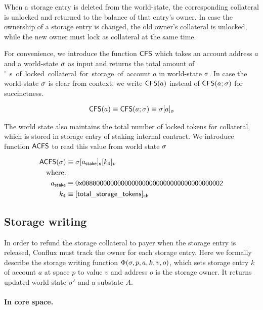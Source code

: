 When a storage entry is deleted from the world-state, the corresponding \sunitprice collateral is unlocked and returned to the balance of that entry's owner.
In case the ownership of a storage entry is changed, 
the old owner's \sunitprice collateral is unlocked,
while the new owner must lock \sunitprice as collateral at the same time.

For convenience, we introduce the function $\mathsf{CFS}$ which takes an account address $a$ and a world-state $\mathbf{\sigma}$ as input and returns the total amount of \unit's of locked collateral for storage of account $a$ in world-state $\mathbf{\sigma}$.
In case the world-state $\mathbf{\sigma}$ is clear from context, we write $\mathsf{CFS}(a)$ instead of $\mathsf{CFS}(a;\mathbf{\sigma})$ for succinctness.

\begin{align}
	\mathsf{CFS}(a) \equiv \mathsf{CFS}(a;\mathbf{\sigma}) \equiv \mathbf{\sigma}[a]_o
\end{align}

The world state also maintains the total number of locked tokens for collateral, which is stored in storage entry of staking internal contract. We introduce function ${\sf ACFS}$ to read this value from world state $\mathbf{\sigma}$

\begin{align}
	\mathsf{ACFS}(\st) &\eqdef \st[a_{\sf stake}]_{\bf s}[k_4]_v\\
	\mbox{where:} & \\
	a_{\sf stake} &\eqdef \stakingcontract \\ 
	k_4 &\eqdef {\sf [total\char`_storage\char`_tokens]_{\sf ch}} 
\end{align}

\subsection{Storage writing}\label{sec:storage_maintain}

In order to refund the storage collateral to payer when the storage entry is released, Conflux must track the owner for each storage entry. Here we formally describe the storage writing function $\Phi(\mathbf{\sigma},p,a,k,v,o)$, which sets storage entry $k$ of account $a$ at space $p$ to value $v$ and address $o$ is the storage owner. It returns updated world-state $\mathbf{\sigma}'$ and a substate $A$.

\paragraph{In core space.}

